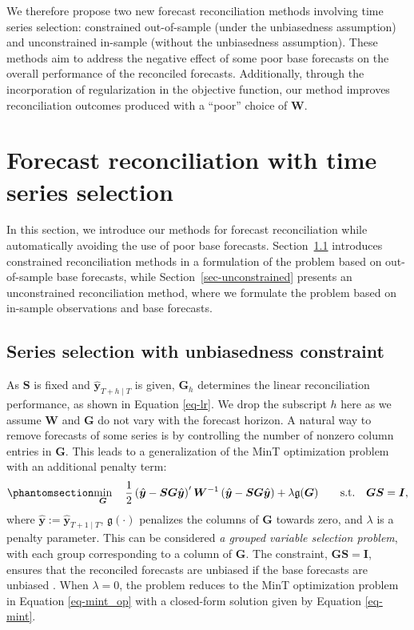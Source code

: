 \documentclass[
  11pt]{article}
\theoremstyle{plain}
\theoremstyle{remark}
\begin{document}
We therefore propose two new forecast reconciliation methods involving
time series selection: constrained out-of-sample (under the unbiasedness
assumption) and unconstrained in-sample (without the unbiasedness
assumption). These methods aim to address the negative effect of some
poor base forecasts on the overall performance of the reconciled
forecasts. Additionally, through the incorporation of regularization in
the objective function, our method improves reconciliation outcomes
produced with a ``poor'' choice of \(\bm{W}\).

\section{Forecast reconciliation with time series
selection}\label{sec-methodology}

In this section, we introduce our methods for forecast reconciliation
while automatically avoiding the use of poor base forecasts.
Section~\ref{sec-constrained} introduces constrained reconciliation
methods in a formulation of the problem based on out-of-sample base
forecasts, while Section~\ref{sec-unconstrained} presents an
unconstrained reconciliation method, where we formulate the problem
based on in-sample observations and base forecasts.

\subsection{Series selection with unbiasedness
constraint}\label{sec-constrained}

As \(\bm{S}\) is fixed and \(\hat{\bm{y}}_{T+h \mid T}\) is given,
\(\bm{G}_h\) determines the linear reconciliation performance, as shown
in Equation \eqref{eq-lr}. We drop the subscript \(h\) here as we assume
\(\bm{W}\) and \(\bm{G}\) do not vary with the forecast horizon. A
natural way to remove forecasts of some series is by controlling the
number of nonzero column entries in \(\bm{G}\). This leads to a
generalization of the MinT optimization problem with an additional
penalty term: \begin{equation}\phantomsection\label{eq-op_u}{
\min_{\bm{G}} \quad \frac{1}{2}\left(\hat{\bm{y}}-\bm{SG}\hat{\bm{y}}\right)^{\prime} \bm{W}^{-1}\left(\hat{\bm{y}}-\bm{SG}\hat{\bm{y}}\right)
+ \lambda\mathfrak{g}(\bm{G}) \qquad \text{s.t.} \quad \bm{G}\bm{S}=\bm{I},
}\end{equation} where \(\hat{\bm{y}}:=\hat{\bm{y}}_{T+1 \mid T}\),
\(\mathfrak{g}(\cdot)\) penalizes the columns of \(\bm{G}\) towards
zero, and \(\lambda\) is a penalty parameter. This can be considered
\emph{a grouped variable selection problem}, with each group
corresponding to a column of \(\bm{G}\). The constraint,
\(\bm{G}\bm{S}=\bm{I}\), ensures that the reconciled forecasts are
unbiased if the base forecasts are unbiased
\citep{Wickramasuriya2019-fc}. When \(\lambda = 0\), the problem reduces
to the MinT optimization problem in Equation \eqref{eq-mint_op} with a
closed-form solution given by Equation \eqref{eq-mint}.
\end{document}
